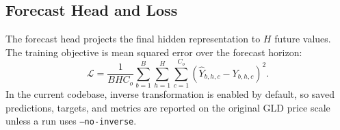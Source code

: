 \subsection{Forecast Head and Loss}

The forecast head projects the final hidden representation to $H$ future values.
The training objective is mean squared error over the forecast horizon:
\begin{equation}
    \mathcal{L}
    =
    \frac{1}{BHC_o}
    \sum_{b=1}^{B}
    \sum_{h=1}^{H}
    \sum_{c=1}^{C_o}
    \left(
    \hat{Y}_{b,h,c} - Y_{b,h,c}
    \right)^2.
\end{equation}
In the current codebase, inverse transformation is enabled by default, so saved predictions, targets, and metrics are reported on the original GLD price scale unless a run uses \texttt{--no-inverse}.
